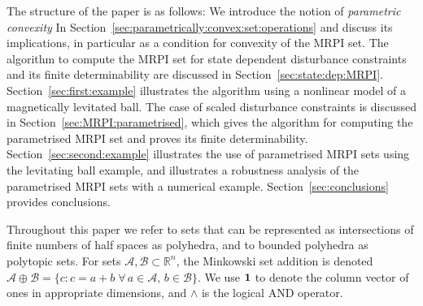 \documentclass[letterpaper, 10pt, conference]{ieeeconf} %
\begin{document}
The structure of the paper is as follows: We introduce the notion of \emph{parametric convexity} In
Section~\ref{sec:parametrically:convex:set:operations} and discuss its implications, in particular as a condition 
for convexity of the MRPI set. The algorithm to compute the MRPI set for state dependent disturbance
constraints and its finite determinability are discussed in Section~\ref{sec:state:dep:MRPI}.
Section~\ref{sec:first:example} illustrates the algorithm using a nonlinear model of a magnetically 
levitated ball. The case of scaled disturbance constraints is discussed in Section~\ref{sec:MRPI:parametrised},
which gives the algorithm for computing the parametrised MRPI set and
proves its finite determinability. Section~\ref{sec:second:example} illustrates the use of
parametrised MRPI sets using the levitating ball example, and illustrates a robustness analysis of the parametrised
MRPI sets with a numerical example. Section~\ref{sec:conclusions}
provides conclusions.

Throughout this paper we refer to sets that can be represented as intersections of finite numbers of half spaces as polyhedra, and to bounded polyhedra as polytopic sets. For sets $\mathcal A, \mathcal B \subset\mathbb R^n$, the Minkowski set addition is denoted $\mathcal A\oplus\mathcal B = \{c : c = a + b\; \forall\,a\in\mathcal A,\, b\in\mathcal B\}$.
We use ${\bf{1}}$ to denote the column vector of ones in appropriate dimensions, and $\wedge$ is the logical AND operator. 
%
%
%
\end{document}
